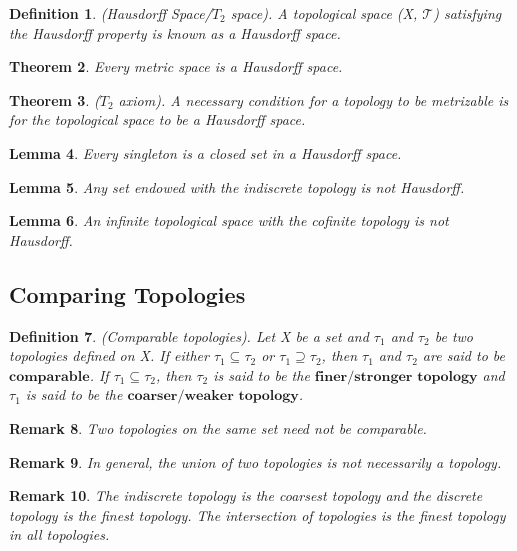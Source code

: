 \documentclass[twoside]{article}
\newcounter{lecnum}
\newtheorem{theorem}{Theorem}[lecnum]
\newtheorem{lemma}[theorem]{Lemma}
\newtheorem{definition}[theorem]{Definition}
\newtheorem{remark}[theorem]{Remark}
\begin{document}
\begin{definition}(Hausdorff Space/$T_2$ space). A topological space (X, $\mathcal{T}$) satisfying the Hausdorff property is known as a Hausdorff space.
\end{definition}

\begin{theorem}Every metric space is a Hausdorff space.
\end{theorem}

\begin{theorem}($T_2$ axiom). A necessary condition for a topology to be metrizable is for the topological space to be a Hausdorff space.
\end{theorem}

\begin{lemma}Every singleton is a closed set in a Hausdorff space.
\end{lemma}

\begin{lemma}Any set endowed with the indiscrete topology is not Hausdorff.
\end{lemma}

\begin{lemma}An infinite topological space with the cofinite topology is not Hausdorff.
\end{lemma}

\subsection{Comparing Topologies}
\begin{definition}(Comparable topologies). Let X be a set and $\tau_1$ and $\tau_2$ be two topologies defined on X. If either $\tau_1 \subseteq \tau_2$ or $\tau_1 \supseteq \tau_2$, then $\tau_1$ and $\tau_2$ are said to be $\textbf{comparable}$. If $\tau_1 \subseteq \tau_2$, then $\tau_2$ is said to be the $\textbf{finer/stronger topology}$ and $\tau_1$ is said to be the $\textbf{coarser/weaker topology}$.
\end{definition}

\begin{remark} Two topologies on the same set need not be comparable.
\end{remark}

\begin{remark} In general, the union of two topologies is not necessarily a topology.
\end{remark}

\begin{remark}The indiscrete topology is the coarsest topology and the discrete topology is the finest topology. The intersection of topologies is the finest topology in all topologies.
\end{remark}
\end{document}
